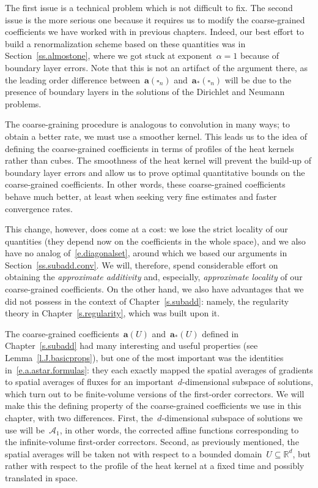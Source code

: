 \documentclass[11pt,twoside]{article} %
\let\oldsquare\square %
\renewcommand{\square}{\oldsquare}
\numberwithin{equation}{section}
\theoremstyle{definition}
\newcommand*{\Rd}{\ensuremath{\mathbb{R}^d}}
\renewcommand{\a}{\mathbf{a}}
\newcommand{\cu}{\square}
\begin{document}
The first issue is a technical problem which is not difficult to fix. The second issue is the more serious one because it requires us to modify the coarse-grained coefficients we have worked with in previous chapters. Indeed, our best effort to build a renormalization scheme based on these quantities was in Section~\ref{ss.almostone}, where we got stuck at exponent~$\alpha =1$ because of boundary layer errors. Note that this is not an artifact of the argument there, as the leading order difference between~$\a(\cu_n)$ and~$\a_*(\cu_n)$ will be due to the presence of boundary layers in the solutions of the Dirichlet and Neumann problems. 

\smallskip

The coarse-graining procedure is analogous to convolution in many ways; to obtain a better rate, we must use a smoother kernel. This leads us to the idea of defining the coarse-grained coefficients in terms of profiles of the heat kernels rather than cubes. 
The smoothness of the heat kernel will prevent the build-up of boundary layer errors and allow us to prove optimal quantitative bounds on the coarse-grained coefficients. In other words, these coarse-grained coefficients behave much better, at least when seeking very fine estimates and faster convergence rates. 

\smallskip

This change, however, does come at a cost: we lose the strict locality of our quantities (they depend now on the coefficients in the whole space), and we also have no analog of~\eqref{e.diagonalset}, around which we based our arguments in Section~\ref{ss.subadd.conv}. We will, therefore, spend considerable effort on obtaining the \emph{approximate additivity} and, especially,  \emph{approximate locality} of our coarse-grained coefficients. On the other hand, we also have advantages that we did not possess in the context of Chapter~\ref{s.subadd}: namely, the regularity theory in Chapter~\ref{s.regularity}, which was built upon it. 

\smallskip

The coarse-grained coefficients~$\a(U)$ and~$\a_*(U)$ defined in Chapter~\ref{s.subadd} had many interesting and useful properties (see Lemma~\ref{l.J.basicprops}), but one of the most important was the identities in~\eqref{e.a.astar.formulas}: they each exactly mapped the spatial averages of gradients to spatial averages of fluxes for an important~$d$-dimensional subspace of solutions, which turn out to be finite-volume versions of the first-order correctors. We will make this the defining property of the coarse-grained coefficients we use in this chapter, with two differences. First, the~$d$-dimensional subspace of solutions we use will be~$\mathcal{A}_1$, in other words, the corrected affine functions corresponding to the infinite-volume first-order correctors. Second, as previously mentioned, the spatial averages will be taken not with respect to a bounded domain~$U\subseteq\Rd$, but rather with respect to the profile of the heat kernel at a fixed time and possibly translated in space.
\end{document}
